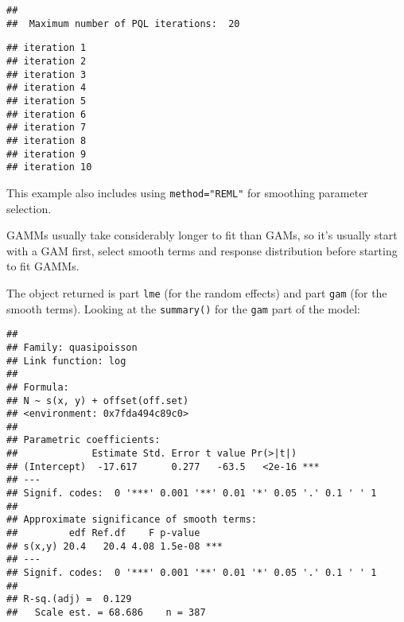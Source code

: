 \documentclass[]{article}
\newenvironment{Shaded}{}{}
\newcommand{\KeywordTok}[1]{\textcolor[rgb]{0.00,0.44,0.13}{\textbf{{#1}}}}
\newcommand{\DataTypeTok}[1]{\textcolor[rgb]{0.56,0.13,0.00}{{#1}}}
\newcommand{\StringTok}[1]{\textcolor[rgb]{0.25,0.44,0.63}{{#1}}}
\newcommand{\NormalTok}[1]{{#1}}
\begin{document}
\begin{Shaded}
\end{Shaded}

\begin{verbatim}
## 
##  Maximum number of PQL iterations:  20
\end{verbatim}

\begin{verbatim}
## iteration 1
## iteration 2
## iteration 3
## iteration 4
## iteration 5
## iteration 6
## iteration 7
## iteration 8
## iteration 9
## iteration 10
\end{verbatim}

This example also includes using \texttt{method="REML"} for smoothing
parameter selection.

GAMMs usually take considerably longer to fit than GAMs, so it's usually
start with a GAM first, select smooth terms and response distribution
before starting to fit GAMMs.

The object returned is part \texttt{lme} (for the random effects) and
part \texttt{gam} (for the smooth terms). Looking at the
\texttt{summary()} for the \texttt{gam} part of the model:

\begin{Shaded}
\end{Shaded}

\begin{verbatim}
## 
## Family: quasipoisson 
## Link function: log 
## 
## Formula:
## N ~ s(x, y) + offset(off.set)
## <environment: 0x7fda494c89c0>
## 
## Parametric coefficients:
##             Estimate Std. Error t value Pr(>|t|)    
## (Intercept)  -17.617      0.277   -63.5   <2e-16 ***
## ---
## Signif. codes:  0 '***' 0.001 '**' 0.01 '*' 0.05 '.' 0.1 ' ' 1
## 
## Approximate significance of smooth terms:
##         edf Ref.df    F p-value    
## s(x,y) 20.4   20.4 4.08 1.5e-08 ***
## ---
## Signif. codes:  0 '***' 0.001 '**' 0.01 '*' 0.05 '.' 0.1 ' ' 1
## 
## R-sq.(adj) =  0.129   
##   Scale est. = 68.686    n = 387
\end{verbatim}
\end{document}
